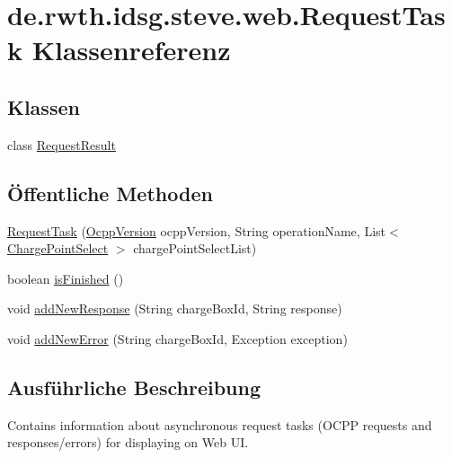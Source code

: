 \hypertarget{classde_1_1rwth_1_1idsg_1_1steve_1_1web_1_1_request_task}{\section{de.\-rwth.\-idsg.\-steve.\-web.\-Request\-Task Klassenreferenz}
\label{classde_1_1rwth_1_1idsg_1_1steve_1_1web_1_1_request_task}
}
\subsection*{Klassen}
\begin{DoxyCompactItemize}
\item 
class \hyperlink{classde_1_1rwth_1_1idsg_1_1steve_1_1web_1_1_request_task_1_1_request_result}{Request\-Result}
\end{DoxyCompactItemize}
\subsection*{Öffentliche Methoden}
\begin{DoxyCompactItemize}
\item 
\hyperlink{classde_1_1rwth_1_1idsg_1_1steve_1_1web_1_1_request_task_a710e28f81649d3b8a86ad7a1fe0738c4}{Request\-Task} (\hyperlink{enumde_1_1rwth_1_1idsg_1_1steve_1_1ocpp_1_1_ocpp_version}{Ocpp\-Version} ocpp\-Version, String operation\-Name, List$<$ \hyperlink{classde_1_1rwth_1_1idsg_1_1steve_1_1repository_1_1dto_1_1_charge_point_select}{Charge\-Point\-Select} $>$ charge\-Point\-Select\-List)
\item 
boolean \hyperlink{classde_1_1rwth_1_1idsg_1_1steve_1_1web_1_1_request_task_a5a1147a721995b809a79e1bea71b500b}{is\-Finished} ()
\item 
void \hyperlink{classde_1_1rwth_1_1idsg_1_1steve_1_1web_1_1_request_task_af48ae2706256ca8c6876ca84fddd08fe}{add\-New\-Response} (String charge\-Box\-Id, String response)
\item 
void \hyperlink{classde_1_1rwth_1_1idsg_1_1steve_1_1web_1_1_request_task_a5c47cb108530177908489dc000c76477}{add\-New\-Error} (String charge\-Box\-Id, Exception exception)
\end{DoxyCompactItemize}


\subsection{Ausführliche Beschreibung}
Contains information about asynchronous request tasks (O\-C\-P\-P requests and responses/errors) for displaying on Web U\-I.

